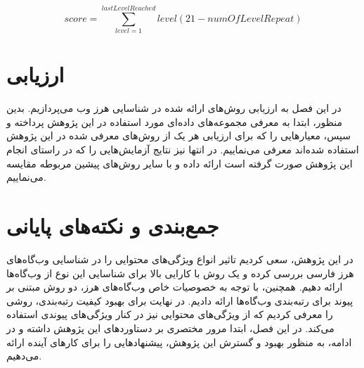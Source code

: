 \documentclass[twoside, a4paper,11pt]{book}
\numberwithin{equation}{chapter}
\numberwithin{table}{chapter}
\numberwithin{figure}{chapter}
\numberwithin{equation}{chapter}
\begin{document}
\begin{equation}
	score = \sum_{level=1}^{lastLevelReached} level(21-numOfLevelRepeat)
\end{equation}


\chapter{ارزیابی}
\label{chapter:experiments}
\thispagestyle{plain}
در این فصل به ارزیابی روش‌های ارائه شده در شناسایی هرز وب می‌پردازیم. بدین منظور، ابتدا به معرفی مجموعه‌های داده‌ای مورد استفاده در این پژوهش پرداخته و سپس، معیارهایی را که برای ارزیابی هر یک از روش‌های معرفی شده در این پژوهش استفاده شده‌اند معرفی می‌نماییم. در انتها نیز نتایج آزمایش‌هایی را که در راستای انجام این پژوهش صورت گرفته است ارائه داده و با سایر روش‌های پیشین مربوطه مقایسه می‌نماییم.



\chapter{جمع‌بندی و نکته‌های پایانی}
\label{chapter:conclusion}
\thispagestyle{plain}
در این پژوهش، سعی کردیم تاثیر انواع ویژگی‌های محتوایی را در شناسایی وب‌گاه‌های هرز فارسی بررسی کرده و یک روش با کارایی بالا برای شناسایی این نوع از وب‌گاه‌ها ارائه دهیم. همچنین، با توجه به خصوصیات خاص وب‌گاه‌های هرز، دو روش مبتنی بر پیوند برای رتبه‌بندی وب‌گاه‌ها ارائه دادیم. در نهایت برای بهبود کیفیت رتبه‌بندی، روشی را معرفی کردیم که از ویژگی‌های محتوایی نیز در کنار ویژگی‌های پیوندی استفاده می‌کند. در این فصل، ابتدا مرور مختصری بر دستاوردهای این پژوهش داشته و در ادامه، به منظور بهبود و گسترش این پژوهش، پیشنهادهایی را برای کارهای آینده ارائه می‌دهیم. 



\newpage
\thispagestyle{empty}
\mbox{}

\linespread{1}


\small{

\renewcommand{\bibname}{مراجع}
\clearpage

}

\newpage
\thispagestyle{empty}
\mbox{}
\begin{multicols}{2}
\begin{doublespace}

\printglossary[type=latin]

\newpage
\thispagestyle{empty}
\mbox{}

\clearpage
{}
\printglossary[type=persian]
\end{doublespace}
\end{multicols}
\end{document}
